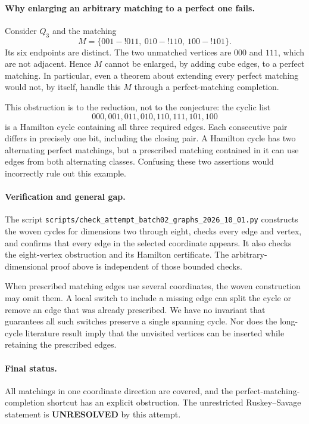 \documentclass[11pt,a4paper]{article}
\begin{document}
\paragraph{Why enlarging an arbitrary matching to a perfect one fails.}
Consider $Q_3$ and the matching
\[
 M=\{001\!-!011,\ 010\!-!110,\ 100\!-!101\}.
\]
Its six endpoints are distinct. The two unmatched vertices are $000$ and $111$, which are not adjacent. Hence $M$ cannot be enlarged, by adding cube edges, to a perfect matching. In particular, even a theorem about extending every perfect matching would not, by itself, handle this $M$ through a perfect-matching completion.

This obstruction is to the reduction, not to the conjecture: the cyclic list
\[
 000,001,011,010,110,111,101,100
\]
is a Hamilton cycle containing all three required edges. Each consecutive pair differs in precisely one bit, including the closing pair. A Hamilton cycle has two alternating perfect matchings, but a prescribed matching contained in it can use edges from both alternating classes. Confusing these two assertions would incorrectly rule out this example.

\paragraph{Verification and general gap.}
The script \texttt{scripts/check\_attempt\_batch02\_graphs\_2026\_10\_01.py} constructs the woven cycles for dimensions two through eight, checks every edge and vertex, and confirms that every edge in the selected coordinate appears. It also checks the eight-vertex obstruction and its Hamilton certificate. The arbitrary-dimensional proof above is independent of those bounded checks.

When prescribed matching edges use several coordinates, the woven construction may omit them. A local switch to include a missing edge can split the cycle or remove an edge that was already prescribed. We have no invariant that guarantees all such switches preserve a single spanning cycle. Nor does the long-cycle literature result imply that the unvisited vertices can be inserted while retaining the prescribed edges.

\paragraph{Final status.}
All matchings in one coordinate direction are covered, and the perfect-matching-completion shortcut has an explicit obstruction. The unrestricted Ruskey--Savage statement is \textbf{UNRESOLVED} by this attempt.
\end{document}

